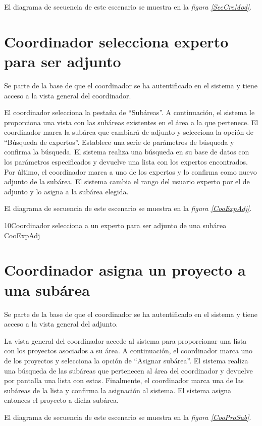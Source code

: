 \documentclass[11pt,a4paper,spanish,twoside]{book}
\begin{document}
El diagrama de secuencia de este escenario se muestra en la \emph{figura
\ref{SecCreMod}}.


\section{Coordinador selecciona experto para ser adjunto}
Se parte de la base de que el coordinador se ha autentificado en el sistema y
tiene acceso a la vista general del coordinador.

El coordinador selecciona la pestaña de ``Subáreas''. A continuación, el
sistema le proporciona una vista con las subáreas existentes en el área a la
que pertenece. El coordinador marca la subárea que cambiará de adjunto y
selecciona la opción de ``Búsqueda de expertos''. Establece una serie de
parámetros de búsqueda y confirma la búsqueda. El sistema realiza una búsqueda
en su base de datos con los parámetros especificados y devuelve una lista
con los expertos encontrados. Por último, el coordinador marca a uno de los
expertos y lo confirma como nuevo adjunto de la subárea. El sistema cambia
el rango del usuario experto por el de adjunto y lo asigna a la subárea
elegida.

El diagrama de secuencia de este escenario se muestra en la \emph{figura
\ref{CooExpAdj}}.

{10}{Coordinador selecciona a un experto para ser adjunto de una subárea}
{CooExpAdj}

\section{Coordinador asigna un proyecto a una subárea}
Se parte de la base de que el coordinador se ha autentificado en el sistema y
tiene acceso a la vista general del adjunto.

La vista general del coordinador accede al sistema para proporcionar una
lista con los proyectos asociados a su área. A continuación, el coordinador
marca uno de los proyectos y selecciona la opción de ``Asignar subárea''. El
sistema realiza una búsqueda de las subáreas que pertenecen al área del
coordinador y devuelve por pantalla una lista con estas. Finalmente, el
coordinador marca una de las subáreas de la lista y confirma la asignación
al sistema. El sistema asigna entonces el proyecto a dicha subárea.

El diagrama de secuencia de este escenario se muestra en la \emph{figura
\ref{CooProSub}}.
\end{document}
